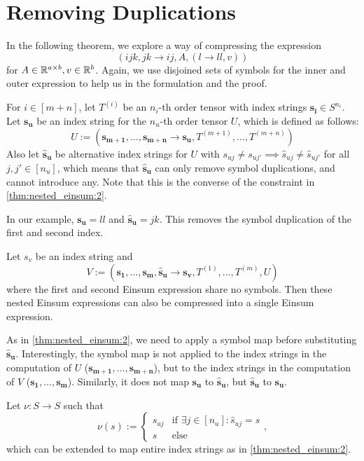 \section{Removing Duplications}

In the following theorem, we explore a way of compressing the expression
$$(ijk, jk \rightarrow ij, A, (l \rightarrow ll, v))$$
for $A \in \mathbb{R}^{a \times b}, v \in \mathbb{R}^b$.
Again, we use disjoined sets of symbols for the inner and outer expression to help us in the formulation and the proof.

\begin{theorem}
    \label{thm:nested_einsum:3}

    For $i \in [m + n]$, let $T^{(i)}$ be an $n_i$-th order tensor with index strings $\bm{s_i} \in S^{n_i}$.
    Let $\bm{s_u}$ be an index string for the $n_u$-th order tensor $U$, which is defined as follows:
    $$U := (\bm{s_{m + 1}},\dots,\bm{s_{m + n}} \rightarrow \bm{s_u}, T^{(m + 1)},\dots,T^{(m + n)})$$
    Also let $\bm{\hat{s}_u}$ be alternative index strings for $U$ with $s_{uj} \neq s_{uj'} \implies \hat{s}_{uj} \neq \hat{s}_{uj'}$ for all $j, j' \in [n_u]$,
    which means that $\bm{\hat{s}_u}$ can only remove symbol duplications, and cannot introduce any.
    Note that this is the converse of the constraint in \autoref{thm:nested_einsum:2}.

    In our example, $\bm{s_u} = ll$ and $\bm{\hat{s}_u} = jk$.
    This removes the symbol duplication of the first and second index.

    Let $s_v$ be an index string and
    $$V := (\bm{s_1},\dots,\bm{s_m}, \bm{\hat{s}_u} \rightarrow \bm{s_v}, T^{(1)},\dots,T^{(m)}, U)$$
    where the first and second Einsum expression share no symbols.
    Then these nested Einsum expressions can also be compressed into a single Einsum expression.

    As in \autoref{thm:nested_einsum:2}, we need to apply a symbol map before substituting $\bm{\hat{s}_u}$.
    Interestingly, the symbol map is not applied to the index strings in the computation of $U$ ($\bm{s_{m + 1}},\dots,\bm{s_{m + n}}$),
    but to the index strings in the computation of $V$ ($\bm{s_1},\dots,\bm{s_m}$).
    Similarly, it does not map $\bm{s_u}$ to $\bm{\hat{s}_u}$, but $\bm{\hat{s}_u}$ to $\bm{s_u}$.

    Let $\nu: S \rightarrow S$ such that
    $$\nu(s) := \begin{cases}
            s_{uj} & \text{if }\exists j \in [n_u]: \hat{s}_{uj} = s \\
            s      & \text{else}
        \end{cases},$$
    which can be extended to map entire index strings as in \autoref{thm:nested_einsum:2}.


\end{theorem}
